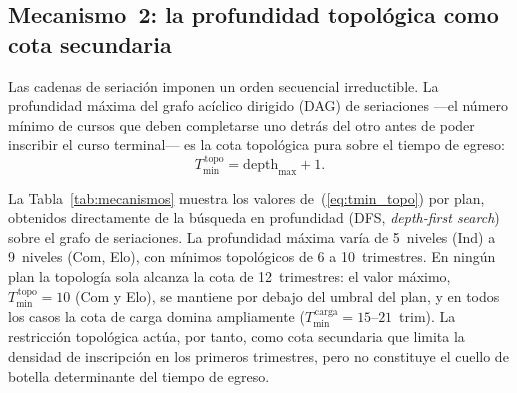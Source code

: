 \documentclass[11pt,letterpaper]{article}
\begin{document}
\subsection{Mecanismo~2: la profundidad topológica como cota secundaria}

Las cadenas de seriación imponen un orden secuencial irreductible.
La profundidad máxima del grafo acíclico dirigido (DAG) de seriaciones ---el número mínimo de cursos
que deben completarse uno detrás del otro antes de poder inscribir el curso
terminal--- es la cota topológica pura sobre el tiempo de egreso:
\begin{equation}
  T_{\min}^{\,\mathrm{topo}} = \mathrm{depth}_{\max} + 1.
  \label{eq:tmin_topo}
\end{equation}

La Tabla~\ref{tab:mecanismos} muestra los valores de~(\ref{eq:tmin_topo})
por plan, obtenidos directamente de la búsqueda en profundidad (DFS, \emph{depth-first search}) sobre el grafo de seriaciones.
La profundidad máxima varía de 5~niveles (Ind) a 9~niveles (Com, Elo),
con mínimos topológicos de 6 a 10~trimestres.
En ningún plan la topología sola alcanza la cota de 12~trimestres:
el valor máximo, $T_{\min}^{\,\mathrm{topo}}=10$ (Com y Elo), se mantiene
por debajo del umbral del plan, y en todos los casos la cota de carga
domina ampliamente ($T_{\min}^{\,\mathrm{carga}}=15$--$21$~trim).
La restricción topológica actúa, por tanto, como cota secundaria que
limita la densidad de inscripción en los primeros trimestres, pero no
constituye el cuello de botella determinante del tiempo de egreso.
\end{document}
